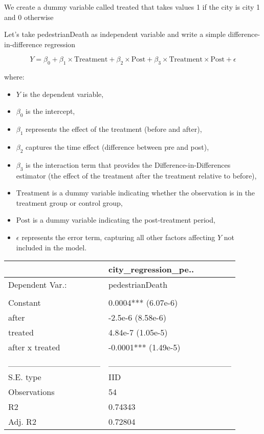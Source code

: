 \documentclass[
]{article}
\providecommand{\tightlist}{%
  \setlength{\itemsep}{0pt}\setlength{\parskip}{0pt}}
\begin{document}
We create a dummy variable called treated that takes values 1 if the
city is city 1 and 0 otherwise

Let's take pedestrianDeath as independent variable and write a simple
difference-in-difference regression

\[ Y = \beta_0 + \beta_1 \times \text{Treatment} + \beta_2 \times \text{Post} + \beta_3 \times \text{Treatment} \times \text{Post} + \epsilon \]

where:

\begin{itemize}
\tightlist
\item
  \(Y\) is the dependent variable,
\item
  \(\beta_0\) is the intercept,
\item
  \(\beta_1\) represents the effect of the treatment (before and after),
\item
  \(\beta_2\) captures the time effect (difference between pre and
  post),
\item
  \(\beta_3\) is the interaction term that provides the
  Difference-in-Differences estimator (the effect of the treatment after
  the treatment relative to before),
\item
  \(\text{Treatment}\) is a dummy variable indicating whether the
  observation is in the treatment group or control group,
\item
  \(\text{Post}\) is a dummy variable indicating the post-treatment
  period,
\item
  \(\epsilon\) represents the error term, capturing all other factors
  affecting \(Y\) not included in the model.
\end{itemize}

\begin{longtable}[]{@{}ll@{}}
\toprule\noalign{}
& city\_regression\_pe.. \\
\midrule\noalign{}
\endhead
\bottomrule\noalign{}
\endlastfoot
Dependent Var.: & pedestrianDeath \\
& \\
Constant & 0.0004*** (6.07e-6) \\
after & -2.5e-6 (8.58e-6) \\
treated & 4.84e-7 (1.05e-5) \\
after x treated & -0.0001*** (1.49e-5) \\
\_\_\_\_\_\_\_\_\_\_\_\_\_\_\_ &
\_\_\_\_\_\_\_\_\_\_\_\_\_\_\_\_\_\_\_\_ \\
S.E. type & IID \\
Observations & 54 \\
R2 & 0.74343 \\
Adj. R2 & 0.72804 \\
\end{longtable}
\end{document}
